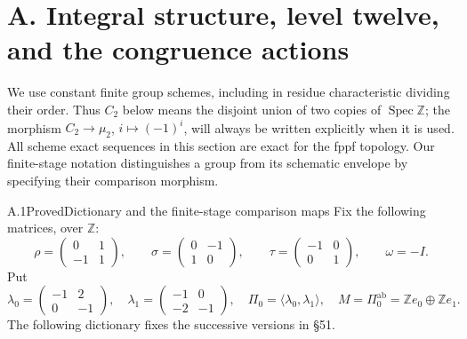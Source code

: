 \section{A. Integral structure, level twelve, and the congruence actions}

We use constant finite group schemes, including in residue characteristic
dividing their order. Thus $C_2$ below means the disjoint union of two
copies of $\operatorname{Spec}\mathbb Z$; the morphism
$C_2\to\mu_2$, $i\mapsto(-1)^i$, will always be written explicitly when
it is used. All scheme exact sequences in this section are exact for the
fppf topology. Our finite-stage notation distinguishes a group from its
schematic envelope by specifying their comparison morphism.

\begin{statement}{A.1}{Proved}{Dictionary and the finite-stage comparison maps}
Fix the following matrices, over $\mathbb Z$:
\[
 \rho=\begin{pmatrix}0&1\\-1&1\end{pmatrix},\qquad
 \sigma=\begin{pmatrix}0&-1\\1&0\end{pmatrix},\qquad
 \tau=\begin{pmatrix}-1&0\\0&1\end{pmatrix},\qquad \omega=-I.
\]
Put
\[
 \lambda_0=\begin{pmatrix}-1&2\\0&-1\end{pmatrix},\quad
 \lambda_1=\begin{pmatrix}-1&0\\-2&-1\end{pmatrix},\quad
 \Pi_0=\langle\lambda_0,\lambda_1\rangle,
 \quad M=\Pi_0^{\mathrm{ab}}=\mathbb Ze_0\oplus\mathbb Ze_1.
\]
The following dictionary fixes the successive versions in \S51.
\end{statement}

